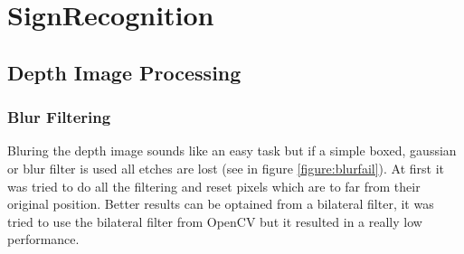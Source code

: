 \chapter{SignRecognition}
\graphicspath{{./Software/img/}}
 
\section{Depth Image Processing}



% 
% 
% 
% 
% 
% 
% 


\subsection{Blur Filtering}
Bluring the depth image sounds like an easy task but 
if a simple boxed, gaussian or blur filter is used all etches are lost (see in figure \vref{figure:blurfail}).
At first it was tried to do all the filtering and reset pixels which are to far from their 
original position. Better results can be optained from a bilateral filter, it was tried to use the 
bilateral filter from OpenCV but it resulted in a really low performance.





